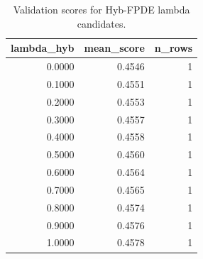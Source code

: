 \begin{table}[t]
\caption{Validation scores for Hyb-FPDE lambda candidates.}
\label{tab:lambda_distribution_computed}
\centering
\begin{tabular}{rrr}
\toprule
lambda\_hyb & mean\_score & n\_rows \\
\midrule
0.0000 & 0.4546 & 1 \\
0.1000 & 0.4551 & 1 \\
0.2000 & 0.4553 & 1 \\
0.3000 & 0.4557 & 1 \\
0.4000 & 0.4558 & 1 \\
0.5000 & 0.4560 & 1 \\
0.6000 & 0.4564 & 1 \\
0.7000 & 0.4565 & 1 \\
0.8000 & 0.4574 & 1 \\
0.9000 & 0.4576 & 1 \\
1.0000 & 0.4578 & 1 \\
\bottomrule
\end{tabular}

\end{table}
